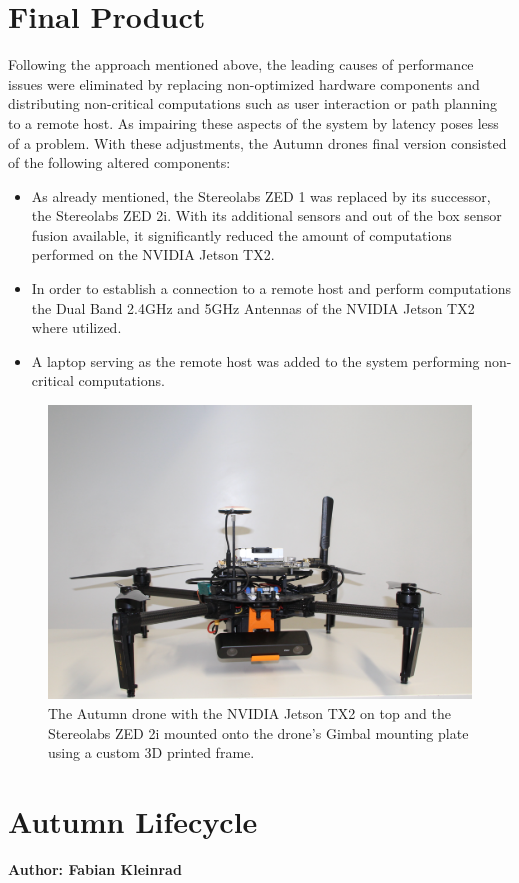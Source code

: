 \section{Final Product}
Following the approach mentioned above, the leading causes of performance issues were eliminated by replacing non-optimized hardware components and distributing non-critical computations such as user interaction or path planning to a remote host. As impairing these aspects of the system by latency poses less of a problem. 
With these adjustments, the Autumn drones final version consisted of the following altered components:
\begin{itemize}
	\item As already mentioned, the Stereolabs ZED 1 was replaced by its successor, the Stereolabs ZED 2i. With its additional sensors and out of the box sensor fusion available, it significantly reduced the amount of computations performed on the NVIDIA Jetson TX2. 
	\item In order to establish a connection to a remote host and perform computations the Dual Band 2.4GHz and 5GHz Antennas of the NVIDIA Jetson TX2 where utilized. 
	\item A laptop serving as the remote host was added to the system performing non-critical computations.
\end{itemize}

\begin{figure}
	\centering
	\includegraphics[width=0.9\linewidth]{img/autumnDrone}
	\caption{
		The Autumn drone with the NVIDIA Jetson TX2 on top and the Stereolabs ZED 2i mounted onto the drone's Gimbal mounting plate using a custom 3D printed frame. 
	}
	\label{fig:autumn}
\end{figure}


\section{Autumn Lifecycle}
\textbf{Author: Fabian Kleinrad} 


\filbreak